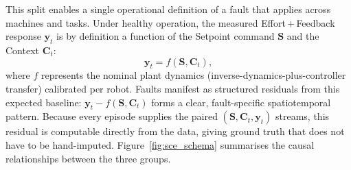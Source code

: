 This split enables a single operational definition of a fault that applies across machines and tasks. Under healthy operation, the measured Effort\,+\,Feedback response $\mathbf{y}_t$ is by definition a function of the Setpoint command $\mathbf{S}$ and the Context $\mathbf{C}_t$:
$$\mathbf{y}_t = f(\mathbf{S}, \mathbf{C}_t),$$
where $f$ represents the nominal plant dynamics (inverse-dynamics-plus-controller transfer) calibrated per robot. Faults manifest as structured residuals from this expected baseline: $\mathbf{y}_t - f(\mathbf{S}, \mathbf{C}_t)$ forms a clear, fault-specific spatiotemporal pattern. Because every episode supplies the paired $(\mathbf{S}, \mathbf{C}_t, \mathbf{y}_t)$ streams, this residual is computable directly from the data, giving ground truth that does not have to be hand-imputed. Figure~\ref{fig:sce_schema} summarises the causal relationships between the three groups.

